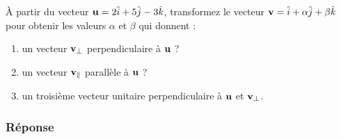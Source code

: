 À partir du vecteur \({\bf u} = 2\hat{i} + 5\hat{j} -3 \hat{k}\),
transformez le vecteur
\({\bf v} = \hat{i} + \alpha \hat{j} + \beta \hat{k}\) pour obtenir les
valeurs \(\alpha\) et \(\beta\) qui donnent :

\begin{enumerate}
\def\labelenumi{\arabic{enumi}.}
\tightlist
\item
  un vecteur \({\bf v}_\perp\) perpendiculaire à \({\bf u}\) ?
\item
  un vecteur \({\bf v}_\parallel\) parallèle à \({\bf u}\) ?
\item
  un troisième vecteur unitaire perpendiculaire à \({\bf u}\) et
  \({\bf v}_\perp\).
\end{enumerate}

\subsubsection{Réponse}

